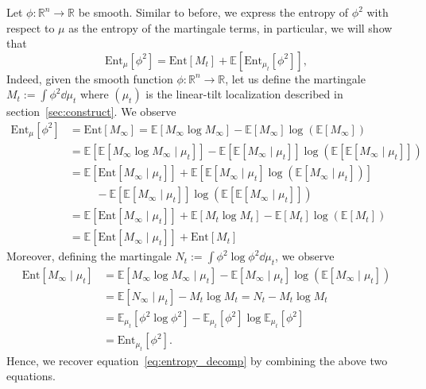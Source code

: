 Let \(\phi : \mathbb{R}^n \to \mathbb{R}\) be smooth.  
Similar to before, we express the entropy of \(\phi^2\) with respect to \(\mu\) as 
the entropy of the martingale terms, in particular, we will show that
\begin{equation}\label{eq:entropy_decomp}
  \text{Ent}_\mu[\phi^2] = \text{Ent}[M_t] + \mathbb{E}[\text{Ent}_{\mu_t}[\phi^2]],
\end{equation}
Indeed, given the smooth function \(\phi : \mathbb{R}^n \to \mathbb{R}\), let us define the martingale 
\(M_t := \int \phi^2 \dd \mu_t\) where \((\mu_t)\) is the linear-tilt localization described in section~\ref{sec:construct}. 
We observe
\begin{align*}
  \text{Ent}_\mu[\phi^2] & = \text{Ent}[M_\infty] 
    = \mathbb{E}[M_\infty \log M_\infty] - \mathbb{E}[M_\infty]\log(\mathbb{E}[M_\infty]) \\
  & = \mathbb{E}[\mathbb{E}[M_\infty \log M_\infty \mid \mu_t]] 
      - \mathbb{E}[\mathbb{E}[M_\infty \mid \mu_t]]\log(\mathbb{E}[\mathbb{E}[M_\infty \mid \mu_t]]) \\
  & = \mathbb{E}[\text{Ent}[M_\infty \mid \mu_t]] + \mathbb{E}[\mathbb{E}[M_\infty \mid \mu_t]\log(\mathbb{E}[M_\infty \mid \mu_t])]\\ 
  & \hspace{1cm} - \mathbb{E}[\mathbb{E}[M_\infty \mid \mu_t]]\log(\mathbb{E}[\mathbb{E}[M_\infty \mid \mu_t]])\\
  & = \mathbb{E}[\text{Ent}[M_\infty \mid \mu_t]] + \mathbb{E}[M_t \log M_t] - \mathbb{E}[M_t]\log(\mathbb{E}[M_t])\\
  & = \mathbb{E}[\text{Ent}[M_\infty \mid \mu_t]] + \text{Ent}[M_t]
\end{align*}
Moreover, defining the martingale \(N_t := \int \phi^2\log \phi^2 \dd \mu_t\), we observe
\begin{align*}
  \text{Ent}[M_\infty \mid \mu_t] 
  & = \mathbb{E}[M_\infty \log M_\infty \mid \mu_t] - \mathbb{E}[M_\infty \mid \mu_t]\log(\mathbb{E}[M_\infty \mid \mu_t]) \\
  & = \mathbb{E}[N_\infty \mid \mu_t] - M_t \log M_t = N_t - M_t \log M_t\\
  & = \mathbb{E}_{\mu_t}[\phi^2 \log \phi^2] - \mathbb{E}_{\mu_t}[\phi^2] \log \mathbb{E}_{\mu_t}[\phi^2] \\
  & = \text{Ent}_{\mu_t}[\phi^2].
\end{align*}
Hence, we recover equation~\eqref{eq:entropy_decomp} by combining the above two equations.

